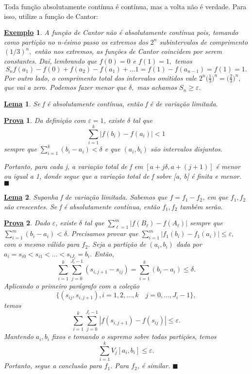 \documentclass{article}
\newtheorem*{lemma*}{\underline{Lema}}
\newtheorem{example}{\underline{Exemplo}}
\newtheorem*{proof*}{\underline{Prova}}
\renewcommand\qedsymbol{$\blacksquare$}
\begin{document}
  Toda função absolutamente contínua é contínua, mas a volta não é verdade. Para isso, utilize a função de Cantor: 
 \begin{example}
   A função de Cantor não é absolutamente contínua pois, tomando como partição no n-ésimo passo os extremos dos \(2^{n}\) subintervalos de comprimento \((1/3)^{n},\) então nos extremos, as funções de Cantor coincidem por serem constantes. Daí, lembrando que \(f(0) = 0 \) e \(f(1) = 1,\) temos 
     \[
       S_{n} f(a_1) - f(0) + f(a_2) - f(a_1) + \dotsc  1 = f(1) - f(a_{n-1}) = f(1) = 1. 
     \]
    Por outro lado, o comprimento total dos intervalos omitidos vale \(2^{n}\biggl(\frac{1}{3}\biggr)^{n} = \biggl(\frac{2}{3}\biggr)^{n},\) que vai a zero. Podemos fazer menor que \(\delta ,\) mas achamos \(S_{n} \geq \varepsilon \).
 \end{example}
 \begin{lemma*}
   Se f é absolutamente contínua, então f é de variação limitada.
 \end{lemma*}
\begin{proof*}
  Da definição com \(\varepsilon  = 1\), existe \(\delta  \) tal que 
    \[
      \sum\limits_{i=1}^{k}|f(b_{i}) - f(a_{i})| < 1
    \]
  sempre que \(\sum\limits_{i=1}^{k}(b_{i} - a_{i}) < \delta \) e que \((a_{i}, b_{i})\) são intervalos disjuntos. 

  Portanto, para cada j, a variação total de f em \([a + j\delta, a + (j+1)]\) é menor ou igual a 1, donde segue que a variação total de f sobre [a, b] é finita e menor. \qedsymbol
\end{proof*}
\begin{lemma*}
  Suponha f de variação limitada. Sabemos que \( f = f_1 - f_2\), em que \(f_1, f_2\) são crescentes. Se f é absolutamente contínua, então \(f_1, f_2\) também serão.
\end{lemma*}
 \begin{proof*}
   Dado \(\varepsilon \), existe \(\delta \) tal que \(\sum\limits_{\ell =1}^{m}|f(B_{\ell }) - f(A_{\ell })|\) sempre que \(\sum\limits_{i=1}^{m}(b_{i}-a_{i}) < \delta .\) Precisamos provar que \(\sum\limits_{i=1}^{m}|f_1(b_{i}) - f_1(a_{i})|\leq \varepsilon ,\) com o mesmo válido para \(f_2\).
   Seja a partição de \((a_{i}, b_{i})\) dada por \(a_{i} = s_{i0} < s_{i1} < \dotsc <s_{iJ_{i}} = b_{i}.\) Então, 
     \[
       \sum\limits_{i=1}^{k}\sum\limits_{j=0}^{J_{i}-1}(s_{i, j+1} - s_{ij}) = \sum\limits_{i=1}^{k}(b_{i}-a_{i})\leq \delta .
     \]
    Aplicando o primeiro parágrafo com a coleção 
      \[
        \{(s_{ij}, s_{i, j+1}), i = 1, 2, \dotsc , k\quad j = 0, \dotsc , J_{i}-1\},
      \]
    temos 
      \[
        \sum\limits_{i=1}^{k}\sum\limits_{j=0}^{J_{i}-1}|f(s_{i, j+1}) - f(s_{ij})|\leq \varepsilon .
      \]
    Mantendo \(a_{i}, b_{i}\) fixos e tomando o supremo sobre todas partições, temos 
      \[
        \sum\limits_{i=1}^{k}V_j[a_{i}, b_{i}] \leq \varepsilon .
      \]
    Portanto, segue a conclusão para \(f_1.\) Para \(f_2\), é similar. \qedsymbol
 \end{proof*}
\end{document}
